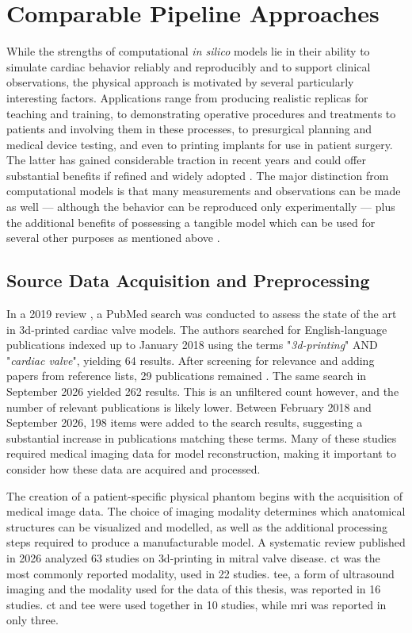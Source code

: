 \section{Comparable Pipeline Approaches}\label{sec:related_work_physical}
While the strengths of computational \emph{in silico} models lie in their ability to simulate cardiac behavior reliably and reproducibly and to support clinical observations, the physical approach is motivated by several particularly interesting factors. Applications range from producing realistic replicas for teaching and training, to demonstrating operative procedures and treatments to patients and involving them in these processes, to presurgical planning and medical device testing, and even to printing implants for use in patient surgery. The latter has gained considerable traction in recent years and could offer substantial benefits if refined and widely adopted \cite{tuncay20193d}. The major distinction from computational models is that many measurements and observations can be made as well --- although the behavior can be reproduced only experimentally --- plus the additional benefits of possessing a tangible model which can be used for several other purposes as mentioned above \cite{lee2026ventricular}.

\subsection{Source Data Acquisition and Preprocessing}\label{subsec:data_acquisition_preprocessing}
In a 2019 review \cite{tuncay20193d}, a PubMed search was conducted to assess the state of the art in \gls{3d}-printed cardiac valve models. The authors searched for English-language publications indexed up to January 2018 using the terms "\emph{\gls{3d}-printing}" AND "\emph{cardiac valve}", yielding 64 results. After screening for relevance and adding papers from reference lists, 29 publications remained \cite{tuncay20193d}. The same search in September 2026 yielded 262 results. This is an unfiltered count however, and the number of relevant publications is likely lower. Between February 2018 and September 2026, 198 items were added to the search results, suggesting a substantial increase in publications matching these terms. Many of these studies required medical imaging data for model reconstruction, making it important to consider how these data are acquired and processed.

The creation of a patient-specific physical phantom begins with the acquisition of medical image data. The choice of imaging modality determines which anatomical structures can be visualized and modelled, as well as the additional processing steps required to produce a manufacturable model. A systematic review published in 2026 \cite{pavlykova20263d} analyzed 63 studies on \gls{3d}-printing in mitral valve disease. \Gls{ct} was the most commonly reported modality, used in 22 studies. \Gls{tee}, a form of ultrasound imaging and the modality used for the data of this thesis, was reported in 16 studies. \gls{ct} and \gls{tee} were used together in 10 studies, while \gls{mri} was reported in only three. 

